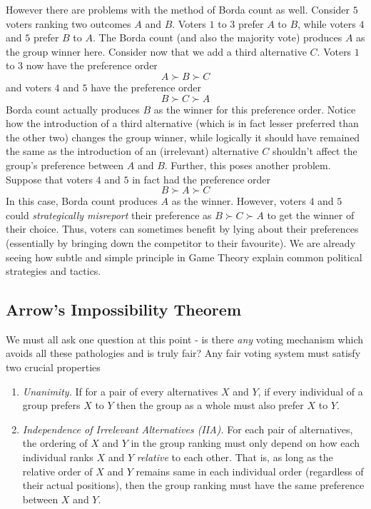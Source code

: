 \documentclass{article}
\theoremstyle{definition}
\begin{document}
However there are problems with the method of Borda count as well. Consider $5$ voters ranking two outcomes $A$ and $B$. Voters $1$ to $3$ prefer $A$ to $B$, while voters $4$ and $5$ prefer $B$ to $A$. The Borda count (and also the majority vote) produces $A$ as the group winner here. Consider now that we add a third alternative $C$. Voters $1$ to $3$ now have the preference order
\[
    A \succ B \succ C
\]
and voters $4$ and $5$ have the preference order
\[
    B \succ C \succ A
\]
Borda count actually produces $B$ as the winner for this preference order. Notice how the introduction of a third alternative (which is in fact lesser preferred than the other two) changes the group winner, while logically it should have remained the same as the introduction of an (irrelevant) alternative $C$ shouldn't affect the group's preference between $A$ and $B$. Further, this poses another problem. Suppose that voters $4$ and $5$ in fact had the preference order
\[
    B \succ A \succ C
\]
In this case, Borda count produces $A$ as the winner. However, voters $4$ and $5$ could \textit{strategically misreport} their preference as $B \succ C \succ A$ to get the winner of their choice. Thus, voters can sometimes benefit by lying about their preferences (essentially by bringing down the competitor to their favourite). We are already seeing how subtle and simple principle in Game Theory explain common political strategies and tactics. \medskip

\subsection{Arrow's Impossibility Theorem}

We must all ask one question at this point - is there \textit{any} voting mechanism which avoids all these pathologies and is truly fair? Any fair voting system must satisfy two crucial properties 
\begin{enumerate}
    \item \textit{Unanimity.} If for a pair of every alternatives $X$ and $Y$, if every individual of a group prefers $X$ to $Y$ then the group as a whole must also prefer $X$ to $Y$.
    \item \textit{Independence of Irrelevant Alternatives (IIA).} For each pair of alternatives, the ordering of $X$ and $Y$ in the group ranking must only depend on how each individual ranks $X$ and $Y$ \textit{relative} to each other. That is, as long as the relative order of $X$ and $Y$ remains same in each individual order (regardless of their actual positions), then the group ranking must have the same preference between $X$ and $Y$.
\end{enumerate}
\end{document}
